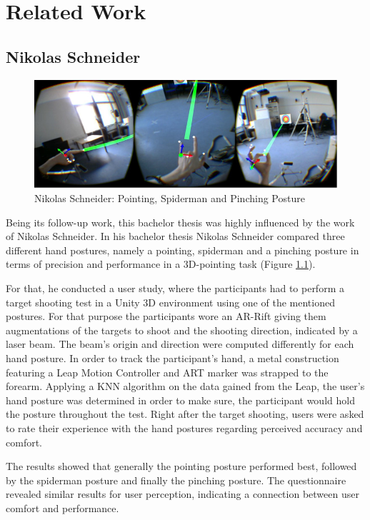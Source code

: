 \chapter{Related Work}\label{chapter:related}

\section{Nikolas Schneider}

\begin{figure}[h]
\centering
\includegraphics[width=\textwidth]{nick}
\caption{Nikolas Schneider: Pointing, Spiderman and Pinching Posture}
\label{fig:Nick}
\end{figure}

Being its follow-up work, this bachelor thesis was highly influenced by the work of Nikolas Schneider. In his bachelor thesis Nikolas Schneider compared three different hand postures, namely a pointing, spiderman and a pinching posture in terms of precision and performance in a 3D-pointing task (Figure \ref{fig:Nick}). 

For that, he conducted a user study, where the participants had to perform a target shooting test in a Unity 3D environment using one of the mentioned postures. For that purpose the participants wore an AR-Rift giving them augmentations of the targets to shoot and the shooting direction, indicated by a laser beam. The beam's origin and direction were computed differently for each hand posture.  In order to track the participant's hand, a metal construction featuring a Leap Motion Controller and ART marker was strapped to the forearm. Applying a KNN algorithm on the data gained from the Leap, the user's hand posture was determined in order to make sure, the participant would hold the posture throughout the test. Right after the target shooting, users were asked to rate their experience with the hand postures regarding perceived accuracy and comfort. 

The results showed that generally the pointing posture performed best, followed by the spiderman posture and finally the pinching posture. The questionnaire revealed similar results for user perception, indicating a connection between user comfort and performance.

